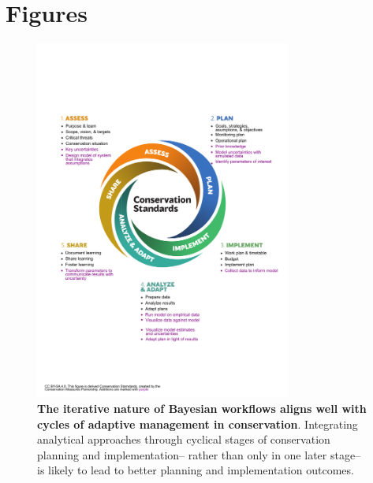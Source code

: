 \documentclass{article}
\begin{document}
\section* {Figures}
 \begin{figure}[h]
\centering
 
  \includegraphics[width=0.75\textwidth]{../figs/CS_revised.pdf}
 \caption{\textbf{The iterative nature of Bayesian workflows aligns well with cycles of adaptive management in conservation}. Integrating analytical approaches through cyclical stages of conservation planning and implementation-- rather than only in one later stage-- is likely to lead to better planning and implementation outcomes.} 
 \label{fig:workflow}
 \end{figure}
\end{document}
